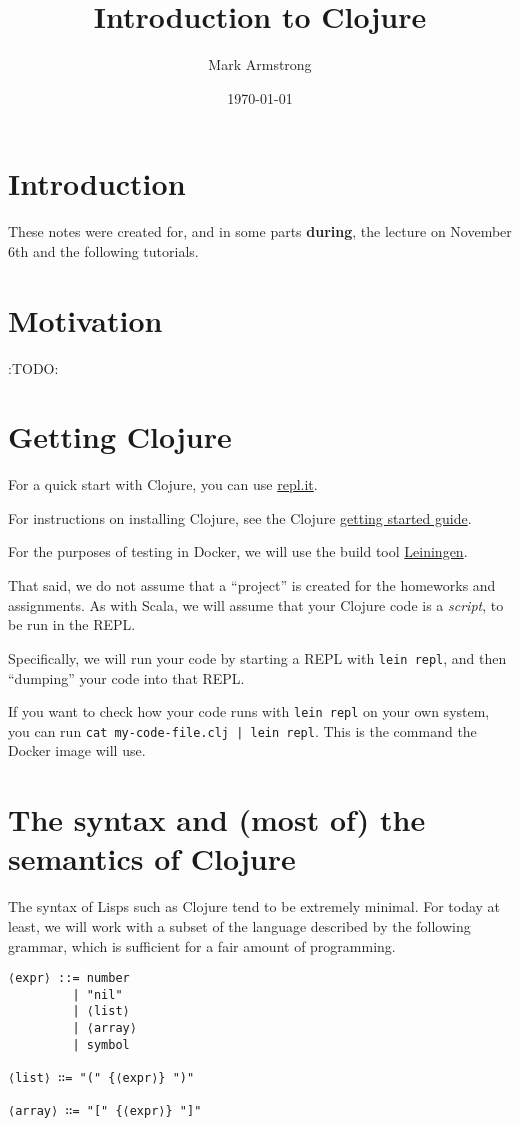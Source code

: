 \documentclass[11pt]{article}
\author{Mark Armstrong}
\date{\today}
\title{Introduction to Clojure}
\begin{document}
\maketitle
\tableofcontents


\section{Introduction}
\label{sec:org0447adb}
These notes were created for, and in some parts \textbf{during},
the lecture on November 6th and the following tutorials.

\section{Motivation}
\label{sec:orge443038}
:TODO:

\section{Getting Clojure}
\label{sec:orga0bc1c3}
For a quick start with Clojure, you can use
\href{https://repl.it/languages/clojure}{repl.it}.

For instructions on installing Clojure,
see the Clojure \href{https://clojure.org/guides/getting\_started}{getting started guide}.

For the purposes of testing in Docker,
we will use the build tool \href{https://leiningen.org/}{Leiningen}.

That said, we do not assume that a “project” is created
for the homeworks and assignments. As with Scala,
we will assume that your Clojure code is a \emph{script},
to be run in the REPL.

Specifically, we will run your code by starting a REPL with \texttt{lein repl},
and then “dumping” your code into that REPL.

If you want to check how your code runs
with \texttt{lein repl} on your own system,
you can run \texttt{cat my-code-file.clj | lein repl}.
This is the command the Docker image will use.

\section{The syntax and (most of) the semantics of Clojure}
\label{sec:org03d183c}
The syntax of Lisps such as Clojure tend to be extremely minimal.
For today at least, we will work with a subset of the language
described by the following grammar, which is sufficient
for a fair amount of programming.
\begin{verbatim}
⟨expr⟩ ::= number
         | "nil"
         | ⟨list⟩
         | ⟨array⟩
         | symbol

⟨list⟩ ∷= "(" {⟨expr⟩} ")"

⟨array⟩ ∷= "[" {⟨expr⟩} "]"
\end{verbatim}
\end{document}

